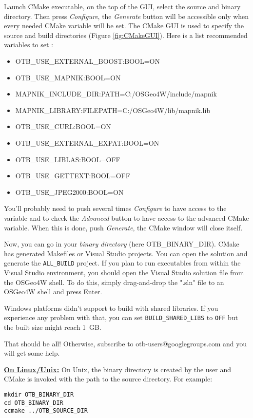 Launch CMake executable, on the top of the GUI, select the source and binary directory.
Then press \emph{Configure}, the \emph{Generate} button will be accessible only when
every needed CMake variable will be set.
The CMake GUI is used to specify the source and build
directories (Figure \ref{fig:CMakeGUI}).
Here is a list recommended variables to set :  
\begin{itemize}
\item OTB\_USE\_EXTERNAL\_BOOST:BOOL=ON
\item OTB\_USE\_MAPNIK:BOOL=ON
\item MAPNIK\_INCLUDE\_DIR:PATH=C:/OSGeo4W/include/mapnik
\item MAPNIK\_LIBRARY:FILEPATH=C:/OSGeo4W/lib/mapnik.lib
\item OTB\_USE\_CURL:BOOL=ON
\item OTB\_USE\_EXTERNAL\_EXPAT:BOOL=ON
\item OTB\_USE\_LIBLAS:BOOL=OFF
\item OTB\_USE\_GETTEXT:BOOL=OFF
\item OTB\_USE\_JPEG2000:BOOL=ON
\end{itemize}

You'll probably need to push several times \emph{Configure} to have access to the variable and to check 
the \emph{Advanced} button to have access to the advanced CMake variable.
When this is done, push \emph{Generate}, the CMake window will close itself.

Now, you can go in your \emph{binary directory} (here OTB\_BINARY\_DIR). CMake has generated Makefiles or
Visual Studio projects. You can open the solution and generate the \texttt{ALL\_BUILD} project.
If you plan to run executables from within the Visual Studio environment, you should open the Visual Studio 
solution file from the OSGeo4W shell. To do this, simply drag-and-drop the ".sln" file to an OSGeo4W shell 
and press Enter.

Windows platforms didn't support to build with shared libraries. If you experience any problem
with that, you can set \texttt{BUILD\_SHARED\_LIBS} to \texttt{OFF} but the
built size might reach 1~GB. 

That should be all! Otherwise, subscribe to
otb-users@googlegroups.com and you will get some help.

\textbf{\underline{On Linux/Unix:}}
On Unix, the binary directory is created by the user and CMake is invoked with the
path to the source directory. For example:
\small
\begin{verbatim}
mkdir OTB_BINARY_DIR
cd OTB_BINARY_DIR
ccmake ../OTB_SOURCE_DIR
\end{verbatim}
\normalsize


